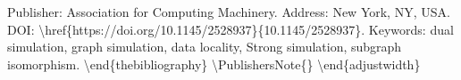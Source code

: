 \documentclass{article}%
\begin{document}
Publisher: Association for Computing Machinery.\newline%
Address: New York, NY, USA.\newline%
DOI: \textbackslash{}href\{https://doi.org/10.1145/2528937\}\{10.1145/2528937\}.\newline%
Keywords: dual simulation, graph simulation, data locality, Strong simulation, subgraph isomorphism.\newline%
\newline%
\textbackslash{}end\{thebibliography\}\newline%
\newline%
\textbackslash{}PublishersNote\{\}\newline%
\textbackslash{}end\{adjustwidth\}

%
\end{document}
